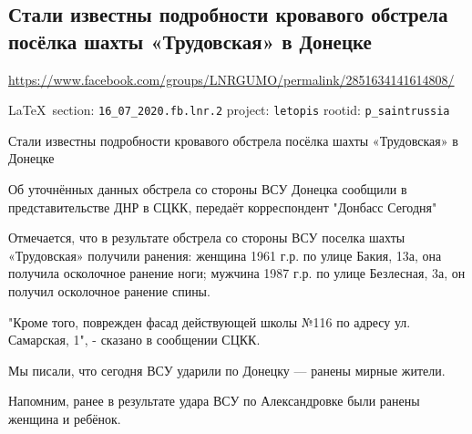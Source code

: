  
 
  
 
\subsection{Стали известны подробности кровавого обстрела посёлка шахты «Трудовская» в Донецке}
\url{https://www.facebook.com/groups/LNRGUMO/permalink/2851634141614808/}

\vspace{0.5cm}
{\ifDEBUG\small\LaTeX~section: \verb|16_07_2020.fb.lnr.2| project: \verb|letopis| rootid: \verb|p_saintrussia|\fi}
\vspace{0.5cm}

Стали известны подробности кровавого обстрела посёлка шахты «Трудовская» в
Донецке

Об уточнённых данных обстрела со стороны ВСУ Донецка сообщили в
представительстве ДНР в СЦКК, передаёт корреспондент "Донбасс Сегодня"

Отмечается, что в результате обстрела со стороны ВСУ поселка шахты «Трудовская»
получили ранения: женщина 1961 г.р. по улице Бакия, 13а, она получила
осколочное ранение ноги; мужчина 1987 г.р. по улице Безлесная, 3а, он получил
осколочное ранение спины.

"Кроме того, поврежден фасад действующей школы №116 по адресу ул. Самарская,
1", - сказано в сообщении СЦКК.

Мы писали, что сегодня ВСУ ударили по Донецку --- ранены мирные жители.

Напомним, ранее в результате удара ВСУ по Александровке были ранены женщина и
ребёнок.
